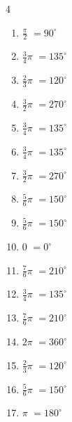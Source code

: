 \begin{multicols}{4}
\begin{enumerate}
  \item $\displaystyle \frac{\pi}{2}$
        $\displaystyle =90^{\circ}$

  \item $\displaystyle \frac{3}{4}\pi$
        $\displaystyle =135^{\circ}$

  \item $\displaystyle \frac{2}{3}\pi$
        $\displaystyle =120^{\circ}$

  \item $\displaystyle \frac{3}{2}\pi$
        $\displaystyle =270^{\circ}$

  \item $\displaystyle \frac{3}{4}\pi$
        $\displaystyle =135^{\circ}$

  \item $\displaystyle \frac{3}{4}\pi$
        $\displaystyle =135^{\circ}$

  \item $\displaystyle \frac{3}{2}\pi$
        $\displaystyle =270^{\circ}$

  \item $\displaystyle \frac{5}{6}\pi$
        $\displaystyle =150^{\circ}$

  \item $\displaystyle \frac{5}{6}\pi$
        $\displaystyle =150^{\circ}$

  \item $\displaystyle 0$
        $\displaystyle =0^{\circ}$

  \item $\displaystyle \frac{7}{6}\pi$
        $\displaystyle =210^{\circ}$

  \item $\displaystyle \frac{3}{4}\pi$
        $\displaystyle =135^{\circ}$

  \item $\displaystyle \frac{7}{6}\pi$
        $\displaystyle =210^{\circ}$

  \item $\displaystyle 2\pi$
        $\displaystyle =360^{\circ}$

  \item $\displaystyle \frac{2}{3}\pi$
        $\displaystyle =120^{\circ}$

  \item $\displaystyle \frac{5}{6}\pi$
        $\displaystyle =150^{\circ}$

  \item $\displaystyle \pi$
        $\displaystyle =180^{\circ}$


\end{enumerate}
\end{multicols}
